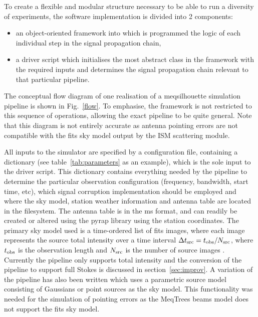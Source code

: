 To create a flexible and modular structure necessary to be able to run a diversity of experiments, the software implementation is divided into 2 components:
\begin{itemize}
 \item an object-oriented framework into which is programmed the logic of each individual step in the signal propagation chain,
 \item a driver script which initialises the most abstract class in the framework with the required inputs and determines the signal propagation chain relevant to that particular pipeline.
\end{itemize}
The conceptual flow diagram of one realisation of a {\sc meqsilhouette} simulation pipeline is shown in Fig.~\ref{flow}. To emphasise, the framework is not restricted to this sequence of operations, allowing the exact pipeline to be quite general. Note that this diagram is not entirely accurate as antenna pointing errors are not compatible with the {\sc fits} sky model output by the ISM scattering module.


All inputs to the simulator are specified by a configuration file, containing a dictionary (see table~\ref{tab:parameters} as an example), which is the sole input to the driver script. This dictionary contains everything needed by the pipeline to determine the particular observation configuration (frequency, bandwidth, start time, etc), which signal corruption implementation should be employed and where the sky model, station weather information and antenna table are located in the filesystem. The antenna table is in the {\sc ms} format, and can readily be created or altered using the {\sc pyrap} library using the station coordinates. The primary sky model used is a time-ordered list of {\sc fits} images, where each image represents the source total intensity over a time interval $\Delta t_{\rm src} = t_{\rm obs}/N_{\rm src}$, where $t_{\rm obs}$ is the observation length and $N_{\rm src}$ is the number of source images \citep{Blecher_2016}. Currently the pipeline only supports total intensity and the conversion of the pipeline to support full Stokes is discussed in section~\ref{sec:improv}. A variation of the pipeline has also been written which uses a parametric source model consisting of Gaussians or point sources as the sky model. This functionality was needed for the simulation of pointing errors as the {\sc MeqTrees} beams model does not support the {\sc fits} sky model.

